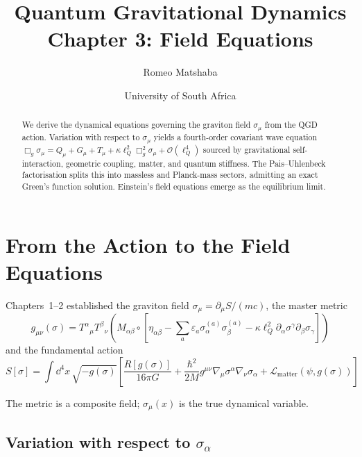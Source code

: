 \documentclass[11pt,a4paper]{article}
\title{\textbf{Quantum Gravitational Dynamics}\\[4pt]
\Large Chapter 3: Field Equations}
\author{Romeo Matshaba}
\date{University of South Africa}
\theoremstyle{plain}
\theoremstyle{definition}
\theoremstyle{remark}
\newcommand{\lQ}{\ell_Q}
\begin{document}
\maketitle

\begin{abstract}
We derive the dynamical equations governing the graviton field $\sigma_\mu$ from the QGD action.  Variation with respect to $\sigma_\mu$ yields a fourth-order covariant wave equation
$\Box_g\sigma_\mu = Q_\mu + G_\mu + T_\mu + \kappa\lQ^2\Box_g^2\sigma_\mu + \mathcal{O}(\lQ^4)$
sourced by gravitational self-interaction, geometric coupling, matter, and quantum stiffness.  The Pais--Uhlenbeck factorisation splits this into massless and Planck-mass sectors, admitting an exact Green's function solution.  Einstein's field equations emerge as the equilibrium limit.
\end{abstract}

\tableofcontents

\section{From the Action to the Field Equations}
\label{sec:variation}

Chapters~1--2 established the graviton field $\sigma_\mu = \partial_\mu S/(mc)$, the master metric
\begin{equation}
  g_{\mu\nu}(\sigma) = T^\alpha{}_\mu T^\beta{}_\nu\!\left(M_{\alpha\beta}\circ\left[\eta_{\alpha\beta} - \sum_a\varepsilon_a\sigma_\alpha^{(a)}\sigma_\beta^{(a)} - \kappa\lQ^2\partial_\alpha\sigma^\gamma\partial_\beta\sigma_\gamma\right]\right)
  \label{eq:master_metric}
\end{equation}
and the fundamental action
\begin{equation}
  S[\sigma] = \int\!\dd^4x\,\sqrt{-g(\sigma)}\left[\frac{R[g(\sigma)]}{16\pi G} + \frac{\hbar^2}{2M}g^{\mu\nu}\nabla_\mu\sigma^\alpha\nabla_\nu\sigma_\alpha + \mathcal{L}_{\mathrm{matter}}(\psi,g(\sigma))\right]
  \label{eq:action}
\end{equation}

The metric is a composite field; $\sigma_\mu(x)$ is the true dynamical variable.

\subsection{Variation with respect to $\sigma_\alpha$}
\end{document}
